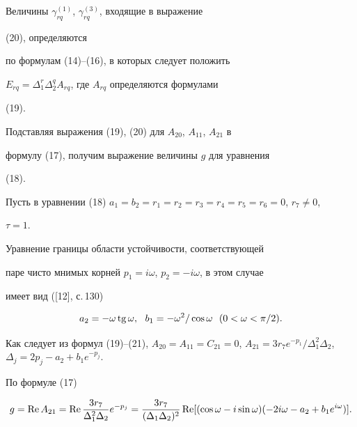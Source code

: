 \begin{exam}
Величины $\gamma^{(1)}_{rq}$, $\gamma^{(3)}_{rq}$, входящие в выражение 


(20), определяются 


по формулам (14)--(16), в которых следует положить 


$E_{rq}=\Delta^r_1\Delta^q_2A_{rq}$, где $A_{rq}$ определяются формулами 


(19). 


 


Подставляя выражения (19), (20) для $A_{20}$, $A_{11}$, $A_{21}$ в 


формулу (17), получим выражение величины $g$ для уравнения 


(18). 


 


Пусть в уравнении (18) $a_1=b_2=r_1=r_2=r_3=r_4=r_5=r_6=0$, $r_7\ne0$, 


$\tau=1$. 


Уравнение границы области устойчивости, соответствующей 


паре чисто мнимых корней $p_1=i\omega$, $p_2=-i\omega$, в этом случае 


имеет вид ([12], с.\,130) 


\begin{equation} 


a_2=-\omega\tg\omega,\ \ b_1=-\omega^2/\cos\omega 


\ \ (0<\omega<\pi/2). 


\end{equation} 


 


Как следует из формул (19)--(21), $A_{20}=A_{11}=C_{21}=0$, $A_{21}=3r_7 


e^{-p_1}/\Delta^2_1\Delta_2$, $\Delta_j=2p_j-a_2+b_1e^{-p_j}$. 


По формуле (17) 


\begin{equation} 


g=\re A_{21}=\re\frac{3r_7}{\Delta^2_1\Delta_2} 


e^{-p_j}=\frac{3r_7}{(\Delta_1\Delta_2)^2} 


\re[(\cos\omega-i\sin\omega) 


(-2i\omega-a_2+b_1e^{i\omega})]. 


\end{equation} 


 



\end{exam}
